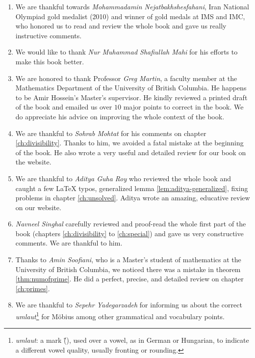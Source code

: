 \documentclass[leqno,12pt]{book}
\begin{document}
\begin{enumerate}
		\item We are thankful towards \textit{Mohammadamin Nejatbakhshesfahani}, Iran National Olympiad gold medalist (2010) and winner of gold medals at IMS and IMC, who honored us to read and review the whole book and gave us really instructive comments.

		\item We would like to thank \textit{Nur Muhammad Shafiullah Mahi} for his efforts to make this book better.

		\item We are honored to thank Professor \textit{Greg Martin}, a faculty member at the Mathematics Department of the University of British Columbia. He happens to be Amir Hossein's Master's supervisor. He kindly reviewed a printed draft of the book and emailed us over $10$ major points to correct in the book. We do appreciate his advice on improving the whole context of the book.

		\item We are thankful to \textit{Sohrab Mohtat} for his comments on chapter \ref{ch:divisibility}. Thanks to him, we avoided a fatal mistake at the beginning of the book. He also wrote a very useful and detailed review for our book on the website.

		\item We are thankful to \textit{Aditya Guha Roy} who reviewed the whole book and caught a few LaTeX typos, generalized lemma \eqref{lem:aditya-generalized}, fixing problems in chapter \ref{ch:unsolved}. Aditya wrote an amazing, educative review on our website.
		\item \textit{Navneel Singhal} carefully reviewed and proof-read the whole first part of the book (chapters \ref{ch:divisibility} to \ref{ch:special}) and gave us very constructive comments. We are thankful to him.

		\item Thanks to \textit{Amin Soofiani}, who is a Master's student of mathematics at the University of British Columbia, we noticed there was a mistake in theorem \eqref{thm:numofprime}. He did a perfect, precise, and detailed review on chapter \ref{ch:primes}.

		\item We are thankful to \textit{Sepehr Yadegarzadeh} for informing us about the correct \textit{umlaut}\footnote{\textit{umlaut}: a mark (\H{}), used over a vowel, as in German or Hungarian, to indicate a different vowel quality, usually fronting or rounding.} for M\"{o}bius among other grammatical and vocabulary points.
	\end{enumerate}
\end{document}
